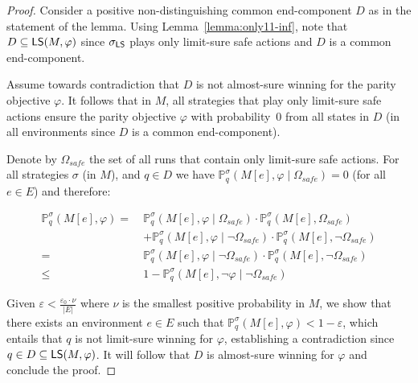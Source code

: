 \documentclass[a4paper,USenglish,cleveref, autoref, thm-restate]{lipics-v2021}
\let\epsilon\varepsilon
\def\abs#1{\ensuremath{\lvert #1 \rvert}}
\newcommand*{\pr}{\mathbb{P}}
\newcommand\limitsure{\textrm{\sf LS}}
\begin{document}
\begin{proof}
	Consider a positive non-distinguishing common end-component $D$ as in 
	the statement of the lemma. Using Lemma~\ref{lemma:only11-inf}, note that $D \subseteq \limitsure(M,\varphi)$
	since $\sigma_{\limitsure}$ plays only limit-sure safe actions and $D$ is a common end-component.

	Assume towards contradiction that $D$ is not almost-sure winning for the parity objective $\varphi$.
	It follows that in $M$, all strategies that play only limit-sure safe 
	actions ensure the parity objective $\varphi$ with probability~$0$
	from all states in $D$ (in all environments since $D$ is a common
	end-component).

	Denote by $\Omega_{safe}$ the set of all runs that contain only limit-sure safe actions.
	For all strategies $\sigma$ (in $M$), and $q \in D$ we have 
	$\pr_{q}^{\sigma}(M[e], \varphi \mid \Omega_{safe}) = 0$ (for all $e\in E$)
	and therefore:

	\begin{align*}
		\pr_{q}^{\sigma}(M[e], \varphi)  = \ & \pr_{q}^{\sigma}(M[e], \varphi \mid \Omega_{safe})
		\cdot \pr_{q}^{\sigma}(M[e], \Omega_{safe}) \\
		& + \pr_{q}^{\sigma}(M[e], \varphi \mid \lnot \Omega_{safe})
		\cdot \pr_{q}^{\sigma}(M[e], \lnot \Omega_{safe}) \\
		= \ & \pr_{q}^{\sigma}(M[e], \varphi \mid \lnot \Omega_{safe})
		\cdot \pr_{q}^{\sigma}(M[e], \lnot \Omega_{safe}) \\
		\leq  \ & 1 - \pr_{q}^{\sigma}(M[e], \lnot \varphi \mid \lnot \Omega_{safe})
	\end{align*}

	Given $\epsilon < \frac{\epsilon_0 \cdot \nu }{\abs{E}}$ 
	where $\nu$ is the smallest positive probability in $M$,
	we show that there exists an environment $e \in E$
	such that $\pr_{q}^{\sigma}(M[e], \varphi) < 1-\epsilon$, which entails that 
	$q$ is not limit-sure winning for $\varphi$, establishing a contradiction since
	$q \in D \subseteq \limitsure(M,\varphi)$. It will follow that $D$ is almost-sure winning for $\varphi$ and conclude the proof.


\end{proof}
\end{document}
